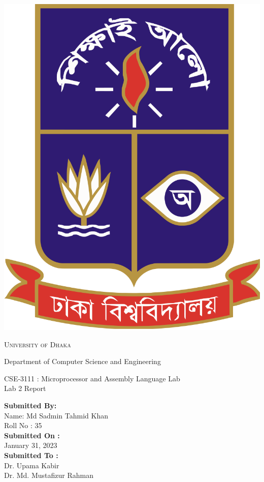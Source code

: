 \documentclass[11pt]{article}
\begin{document}
\begin{titlepage}
	\begin{center}
    	\includegraphics[scale=0.10]{du.png}\par
		\begin{Huge}
			\textsc{University of Dhaka}\par
		\end{Huge}
		\begin{Large}
			Department of Computer Science and Engineering\par \vspace{1cm}
			CSE-3111 : Microprocessor and Assembly Language Lab \\[12pt]	
			Lab 2 Report
		\end{Large}
	\end{center}  	
	\begin{large}
		\textbf{Submitted By:\\[12pt]}
			Name: Md Sadmin Tahmid Khan\\[8pt]
			Roll No : 35\\[12pt]
		\textbf{Submitted On : \\[12pt]}
			January 31, 2023\\[20pt]
		\textbf{Submitted To :\\[12pt]}
			Dr. Upama Kabir\\[12pt]
                Dr. Md. Mustafizur Rahman\\[12pt]
	\end{large}
\end{titlepage}
\end{document}

